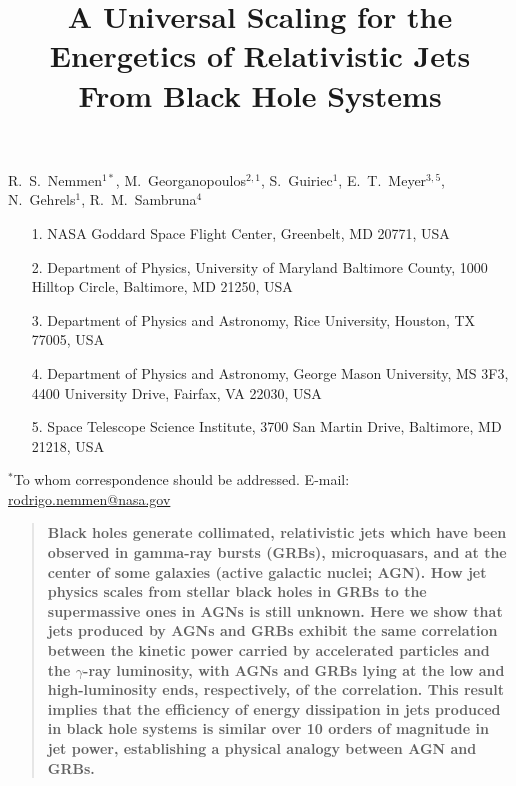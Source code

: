 \documentclass[12pt]{article}
\title{A Universal Scaling for the Energetics of Relativistic Jets From Black Hole Systems}
\date{}
\newenvironment{sciabstract}{%
\begin{quote} \bf}
{\end{quote}}
\begin{document}
 


\maketitle 

\noindent
R.~S.~Nemmen$^{1*}$, 
M.~Georganopoulos$^{2,1}$, 
S.~Guiriec$^{1}$,
E.~T.~Meyer$^{3,5}$, 
N.~Gehrels$^{1}$, 
R.~M.~Sambruna$^{4}$
\medskip
\begin{enumerate}
\item[1.] NASA Goddard Space Flight Center, Greenbelt, MD 20771, USA
\item[2.] Department of Physics, University of Maryland Baltimore County, 1000 Hilltop Circle, Baltimore, MD 21250, USA
\item[3.] Department of Physics and Astronomy, Rice University, Houston, TX 77005, USA
\item[4.] Department of Physics and Astronomy, George Mason University, MS 3F3, 4400 University Drive, Fairfax, VA 22030, USA
\item[5.] Space Telescope Science Institute, 3700 San Martin Drive, Baltimore, MD 21218, USA
\end{enumerate}
$^*$To whom correspondence should be addressed. E-mail: \href{mailto:rodrigo.nemmen@nasa.gov}{rodrigo.nemmen@nasa.gov}
\\


\clearpage


\begin{sciabstract}
Black holes generate collimated, relativistic jets which have been observed in gamma-ray bursts (GRBs), microquasars, and at the center of some galaxies (active galactic nuclei; AGN).
How jet physics scales from stellar black holes in GRBs to the supermassive ones in AGNs is still unknown. 
Here we show that jets produced by AGNs and GRBs exhibit the same correlation between the kinetic power carried by accelerated particles and the $\gamma$-ray luminosity, with AGNs and GRBs lying at the low and high-luminosity ends, respectively, of the correlation. 
This result implies that the efficiency of energy dissipation in jets produced in black hole systems is similar over 10 orders of magnitude in jet power, establishing a physical analogy between AGN and GRBs.  
\end{sciabstract}
\end{document}

